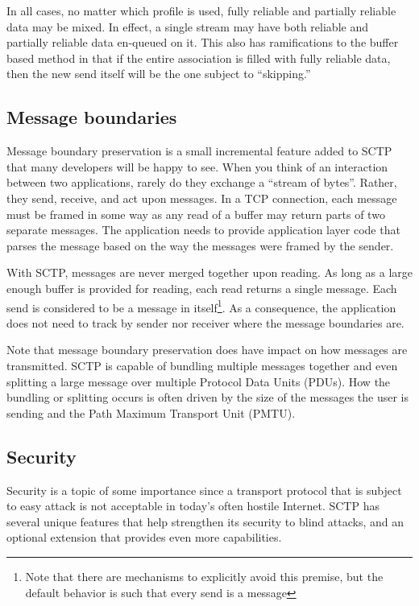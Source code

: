 \documentclass[conference]{IEEEtran}
\begin{document}
In all cases, no matter which profile is used, fully reliable and partially reliable
data may be mixed. In effect, a single stream may have both reliable and
partially reliable data en-queued on it. This also has ramifications to the 
buffer based method in that if the entire association is filled with 
fully reliable data, then the new send itself will be the one subject
to ``skipping.''

\subsection{Message boundaries}
\label{mbound}
Message boundary preservation is a small incremental feature added to
SCTP that many developers will be happy to see. When you think of
an interaction between two applications, rarely do they exchange a ``stream of bytes''.
Rather, they send, receive, and act upon messages. In a TCP connection, each
message must be framed in some way as any read of a buffer may return
parts of two separate messages. The application needs to provide application
layer code that parses the message based on the way the messages
were framed by the sender. 

With SCTP, messages are never merged together upon reading. As long
as a large enough buffer is provided for reading, each read returns a 
single message. Each send is considered to be a message in itself\footnote{Note that
there are mechanisms to explicitly avoid this premise, but the default behavior is such
that every send is a message}. As a consequence, the application does not need to
track by sender nor receiver where the message boundaries are.

Note that message boundary preservation does have impact on how
messages are transmitted. SCTP is capable of bundling multiple messages
together and even splitting a large message over multiple Protocol Data Units (PDUs).
How the bundling or splitting occurs is often driven by the size of the 
messages the user is sending and the Path Maximum Transport Unit (PMTU).


\subsection{Security}
\label{secure}

Security is a topic of  some importance since a transport protocol that is subject
to easy attack is not acceptable in today's often hostile Internet. SCTP has several
unique features that help strengthen its security to blind attacks, and an optional
extension \cite{rfc4895} that provides even more capabilities.
\end{document}
